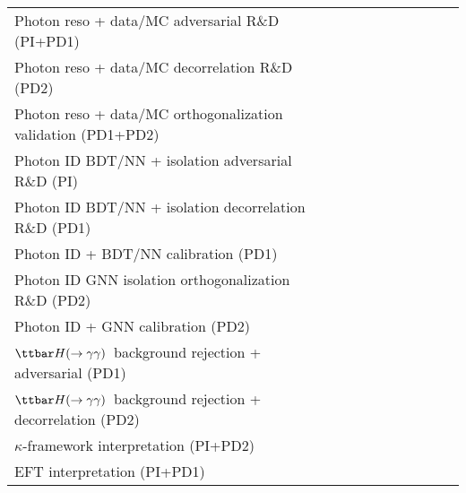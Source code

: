 \documentclass{standalone}
\newcommand{\tthyy}{\ensuremath{\ttbar H(\to\gamma\gamma)}}
\begin{document}
{\setlength{\tabcolsep}{5pt}%
  \begin{threeparttable}%
    \captionsetup{skip=4pt}%
    \begin{tabular}{|l|>{\centering}m{5mm}:>{\centering}m{5mm}|>{\centering}m{5mm}:>{\centering}m{5mm}|>{\centering}m{5mm}:>{\centering}m{5mm}|>{\centering}m{5mm}:>{\centering}m{5mm}|>{\centering}m{5mm}:>{\centering\arraybackslash}m{5mm}|} \hline
      &  &  & & &  \\
      \hline\hline
      Photon reso + data/MC adversarial R\&D (PI+PD1) &  &  &  & & & &  & & & \\ \hline
      Photon reso + data/MC decorrelation R\&D (PD2) &  &  &   & & & &  & & & \\ \hline
      Photon reso + data/MC orthogonalization validation (PD1+PD2) & &  &  &  &  & &  & & & \\ \hline\hline
      Photon ID BDT/NN + isolation adversarial R\&D (PI) & & &  &  &   & &  & & & \\ \hline
      Photon ID BDT/NN + isolation decorrelation R\&D (PD1) & & &  &  &  & &  & & & \\ \hline
      Photon ID + BDT/NN calibration (PD1) & & & &  &  &  & & & & \\
      \hline
      Photon ID GNN isolation orthogonalization R\&D (PD2) & & &  &  &  &  &  & & & \\ \hline
      Photon ID + GNN calibration (PD2) & & & &  &  &  &  & & & \\
      \hline \hline
      \tthyy\ background rejection + adversarial (PD1)\ & & & & & &  &   &  &  & \\ \hline
      \tthyy\ background rejection + decorrelation (PD2)\ & & & & &  &  &   &  &  & \\ \hline \hline
      $\kappa$-framework interpretation (PI+PD2) & & & & & & & &   &  &  \\ \hline 
      EFT interpretation (PI+PD1) & & & & & & & &   &  &  \\ \hline 
      

\end{tabular}
\end{threeparttable}}
\end{document}
